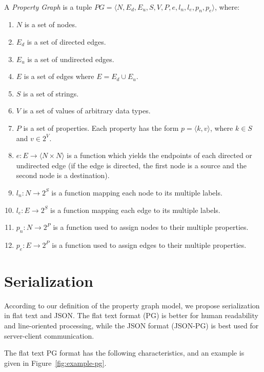\documentclass[runningheads]{llncs}
\begin{document}
\begin{defi}
\leavevmode \vspace{1mm} \\
A \emph{Property Graph} is a tuple
$PG = \langle N, E_d, E_u, S, V, P, e, l_n, l_e, p_n, p_e\rangle$, where:
\begin{enumerate}
    \item $N$ is a set of nodes.
    \item $E_d$ is a set of directed edges.
    \item $E_u$ is a set of undirected edges.
    \item $E$ is a set of edges where $E = E_d \cup E_u$.
    \item $S$ is a set of strings.
    \item $V$ is a set of values of arbitrary data types.
    \item $P$ is a set of properties. Each property has the form $p = \langle k,v \rangle$, where $k \in S$ and $v \in 2^V$.
    \item $e: E \to \langle N \times N \rangle$ is a function which yields the endpoints of each directed or undirected edge (if the edge is directed, the first node is a source and the second node is a destination).
    \item $l_n : N \to 2^S$ is a function mapping each node to its multiple labels.
    \item $l_e : E \to 2^S$ is a function mapping each edge to its multiple labels.
    \item $p_n : N \to 2^P$ is a function used to assign nodes to their multiple properties.
    \item $p_e : E \to 2^P$ is a function used to assign edges to their multiple properties.
\end{enumerate}
\end{defi}

\section{Serialization}
According to our definition of the property graph model, we propose serialization in flat text and JSON. The flat text format (PG) is better for human readability and line-oriented processing, while the JSON format (JSON-PG) is best used for server-client communication.

The flat text PG format has the following characteristics, and an example is given in Figure~\ref{fig:example-pg}.
\end{document}
